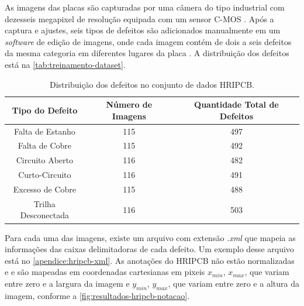 As imagens das placas são capturadas por uma câmera do tipo industrial com dezesseis megapixel de resolução equipada com um sensor C-MOS \cite{ref:Huang-et-al}. Após a captura e ajustes, seis tipos de defeitos são adicionados manualmente em um \textit{software} de edição de imagens, onde cada imagem contém de dois a seis defeitos da mesma categoria em diferentes lugares da placa \cite{ref:Huang-et-al}. A distribuição dos defeitos está na \autoref{tab:treinamento-dataset}.

\begin{table}[!h]
\begin{center}
\caption{Distribuição dos defeitos no conjunto de dados HRIPCB.}
\label{tab:treinamento-dataset}
\begin{tabular}{ccc}
\toprule
\textbf{Tipo do Defeito} & \textbf{Número de Imagens} & \textbf{Quantidade Total de Defeitos} \\
\midrule \midrule
Falta de Estanho    & 115   & 497 \\
Falta de Cobre      & 115   & 492 \\
Circuito Aberto     & 116   & 482 \\
Curto-Circuito      & 116   & 491 \\
Excesso de Cobre    & 115   & 488 \\
Trilha Desconectada & 116   & 503 \\
\bottomrule
\end{tabular}
\end{center}
\end{table}

Para cada uma das imagens, existe um arquivo com extensão \textit{.xml} que mapeia as informações das caixas delimitadoras de cada defeito. Um exemplo desse arquivo está no \autoref{apendice:hripcb-xml}.
As anotações do HRIPCB não estão normalizadas e e são mapeadas em coordenadas cartesianas em pixeis $x_{min}$, $x_{max}$, que variam entre zero e a largura da imagem e $y_{min}$, $y_{max}$, que variam entre zero e a altura da imagem, conforme a \autoref{fig:resultados-hripcb-notacao}.

